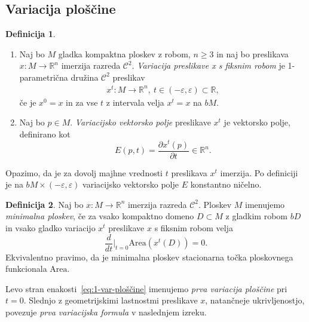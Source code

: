 \documentclass[12pt,a4paper,twoside]{article}
\theoremstyle{definition} %
\newtheorem{definicija}{Definicija}[section]
\theoremstyle{plain} %
\numberwithin{equation}{section}  %
\newcommand{\R}{\mathbb R}
\begin{document}
\subsection{Variacija ploščine}
\begin{definicija}
\begin{enumerate}
\item
Naj bo $M$ gladka kompaktna ploskev z robom, $n \geq 3$ in naj bo preslikava $x \colon M \to \R^{n}$ imerzija razreda $\mathcal{C}^2$. \emph{Variacija preslikave x s fiksnim robom} je 1-parametrična družina $\mathcal{C}^2$ preslikav 
\begin{gather}
x^{t} \colon M \to \R^{n},\ t \in (-\varepsilon, \varepsilon) \subset \R,
\end{gather}
če je $x^0 = x$ in za vse $t$ z intervala velja $x^{t} = x$ na $bM$.
%
\item
Naj bo $p \in M$. \emph{Variacijsko vektorsko polje} preslikave $x^{t}$ je vektorsko polje, definirano kot
\begin{equation}
E(p,t) = \frac{\partial{x^t(p)}}{\partial{t}} \in \R^{n}.
\end{equation}
\end{enumerate}
\end{definicija}

Opazimo, da je za dovolj majhne vrednosti $t$ preslikava $x^{t}$ imerzija.
Po definiciji je na $bM \times (-\varepsilon, \varepsilon)$ variacijsko vektorsko polje $E$ konstantno ničelno.

\begin{definicija}
Naj bo $x \colon M \to \R^{n}$ imerzija razreda $\mathcal{C}^2$. Ploskev $M$ imenujemo \emph{minimalna ploskev}, če za vsako kompaktno domeno $D \subset M$ z gladkim robom $bD$ in vsako gladko variacijo $x^{t}$ preslikave $x$ s fiksnim robom velja
\begin{equation} \label{eq:1-var-ploščine}
\frac{d}{dt} \Big|_{t=0} \text{Area}(x^{t}(D)) = 0.
\end{equation}
Ekvivalentno pravimo, da je minimalna ploskev stacionarna točka ploskovnega funkcionala $\text{Area}$.
\end{definicija}

Levo stran enakosti~\ref{eq:1-var-ploščine} imenujemo \emph{prva variacija ploščine} pri $t=0$. Slednjo z geometrijskimi lastnostmi preslikave $x$, natančneje ukrivljenostjo, povezuje \emph{prva variacijska formula} v naslednjem izreku. 
\end{document}
